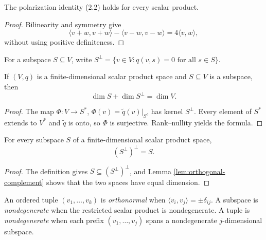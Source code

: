 \begin{proposition}
\label{prop:polarization-scalar-product}


The polarization identity (2.2) holds for every scalar product.
\end{proposition}

\begin{proof}

\sketch Bilinearity and symmetry give
\[
\langle v+w,v+w\rangle-\langle v-w,v-w\rangle=4\langle v,w\rangle,
\]
without using positive definiteness.
\end{proof}

For a subspace $S\subseteq V$, write
$S^\perp=\{v\in V:q(v,s)=0\text{ for all }s\in S\}$.

\begin{lemma}
\label{lem:orthogonal-complement}




If $(V,q)$ is a finite-dimensional scalar product space and $S\subseteq V$ is a
subspace, then
\[
\dim S+\dim S^\perp=\dim V.
\]
\end{lemma}

\begin{proof}

\sketch The map
$\Phi\colon V\to S^*$, $\Phi(v)=\widetilde q(v)|_S$, has kernel $S^\perp$.
Every element of $S^*$ extends to $V^*$ and $\widetilde q$ is onto, so $\Phi$ is
surjective. Rank--nullity yields the formula.
\end{proof}

\begin{lemma}
\label{lem:orthogonal-complement-involution}





For every subspace $S$ of a finite-dimensional scalar product space,
\[
(S^\perp)^\perp=S.
\]
\end{lemma}

\begin{proof}

\sketch The definition gives $S\subseteq(S^\perp)^\perp$, and Lemma
\ref{lem:orthogonal-complement} shows that the two spaces have equal dimension.
\end{proof}

An ordered tuple $(v_1,\ldots,v_k)$ is \emph{orthonormal} when
$\langle v_i,v_j\rangle=\pm\delta_{ij}$. A subspace is \emph{nondegenerate} when
the restricted scalar product is nondegenerate. A tuple is \emph{nondegenerate}
when each prefix $(v_1,\ldots,v_j)$ spans a nondegenerate $j$-dimensional
subspace.

